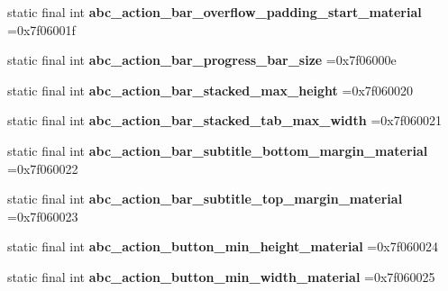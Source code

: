 \begin{DoxyCompactItemize}
\item 
\mbox{\label{classproject4_1_1xaria_1_1R_1_1dimen_a945abff04e9eeb227af27766e9b61b72}} 
static final int {\bfseries abc\+\_\+action\+\_\+bar\+\_\+overflow\+\_\+padding\+\_\+start\+\_\+material} =0x7f06001f
\item 
\mbox{\label{classproject4_1_1xaria_1_1R_1_1dimen_a43f0bf280901745073b81bb4fe4d7369}} 
static final int {\bfseries abc\+\_\+action\+\_\+bar\+\_\+progress\+\_\+bar\+\_\+size} =0x7f06000e
\item 
\mbox{\label{classproject4_1_1xaria_1_1R_1_1dimen_a761f27598a65b80383b23ffce425e729}} 
static final int {\bfseries abc\+\_\+action\+\_\+bar\+\_\+stacked\+\_\+max\+\_\+height} =0x7f060020
\item 
\mbox{\label{classproject4_1_1xaria_1_1R_1_1dimen_a049fc24a13934bcfb8bc84d398317e57}} 
static final int {\bfseries abc\+\_\+action\+\_\+bar\+\_\+stacked\+\_\+tab\+\_\+max\+\_\+width} =0x7f060021
\item 
\mbox{\label{classproject4_1_1xaria_1_1R_1_1dimen_a98295dcb4c632784054a982d9e1dd72e}} 
static final int {\bfseries abc\+\_\+action\+\_\+bar\+\_\+subtitle\+\_\+bottom\+\_\+margin\+\_\+material} =0x7f060022
\item 
\mbox{\label{classproject4_1_1xaria_1_1R_1_1dimen_aa4873e561d0465f0958a5fae8a337467}} 
static final int {\bfseries abc\+\_\+action\+\_\+bar\+\_\+subtitle\+\_\+top\+\_\+margin\+\_\+material} =0x7f060023
\item 
\mbox{\label{classproject4_1_1xaria_1_1R_1_1dimen_a07ce42ea0faf7dd70d5544ca028d03bd}} 
static final int {\bfseries abc\+\_\+action\+\_\+button\+\_\+min\+\_\+height\+\_\+material} =0x7f060024
\item 
\mbox{\label{classproject4_1_1xaria_1_1R_1_1dimen_a3ab3aa6c0ddf25cc3765c7b7222d6ff3}} 
static final int {\bfseries abc\+\_\+action\+\_\+button\+\_\+min\+\_\+width\+\_\+material} =0x7f060025

\end{DoxyCompactItemize}
